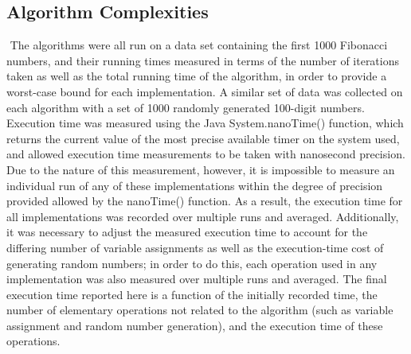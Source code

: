 \documentclass[11pt]{article}
\begin{document}
\subsection{Algorithm Complexities}$ $
\indent
The algorithms were all run on a data set containing the first 1000 Fibonacci numbers, and their running times measured in terms of the number of iterations taken as well as the total running time of the algorithm, in order to provide a worst-case bound for each implementation. A similar set of data was collected on each algorithm with a set of 1000 randomly generated 100-digit numbers. Execution time was measured using the Java System.nanoTime() function, which returns the current value of the most precise available timer on the system used, and allowed execution time measurements to be taken with nanosecond precision. Due to the nature of this measurement, however, it is impossible to measure an individual run of any of these implementations within the degree of precision provided allowed by the nanoTime() function. As a result, the execution time for all implementations was recorded over multiple runs and averaged. Additionally, it was necessary to adjust the measured execution time to account for the differing number of variable assignments as well as the execution-time cost of generating random numbers; in order to do this, each operation used in any implementation was also measured over multiple runs and averaged. The final execution time reported here is a function of the initially recorded time, the number of elementary operations not related to the algorithm (such as variable assignment and random number generation), and the execution time of these operations.
\end{document}
